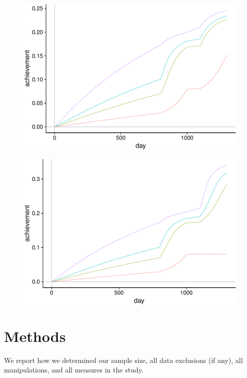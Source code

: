 \documentclass[english,floatsintext,man]{apa6}
\theoremstyle{definition}
\theoremstyle{definition}
\theoremstyle{definition}
\theoremstyle{remark}
\begin{document}
\begin{figure}[htbp]
\centering
\includegraphics{Matthew_effect_origin_AERA2018_files/figure-latex/unnamed-chunk-6-1.pdf}
\caption{}
\end{figure}

\begin{figure}[htbp]
\centering
\includegraphics{Matthew_effect_origin_AERA2018_files/figure-latex/unnamed-chunk-7-1.pdf}
\caption{}
\end{figure}

\section{Methods}\label{methods}

We report how we determined our sample size, all data exclusions (if
any), all manipulations, and all measures in the study.
\end{document}

